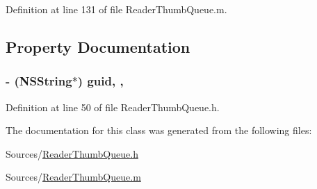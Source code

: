 Definition at line 131 of file Reader\-Thumb\-Queue.\-m.



\subsection{Property Documentation}
\hypertarget{interface_reader_thumb_operation_a00d9e3c5b3f57b2e6ff5de0deebfc3ec}{
\subsubsection[{guid}]{\setlength{\rightskip}{0pt plus 5cm}-\/ (N\-S\-String$\ast$) guid\hspace{0.3cm}{\ttfamily [read]}, {\ttfamily [nonatomic]}, {\ttfamily [strong]}}}\label{d1/d35/interface_reader_thumb_operation_a00d9e3c5b3f57b2e6ff5de0deebfc3ec}


Definition at line 50 of file Reader\-Thumb\-Queue.\-h.



The documentation for this class was generated from the following files\-:\begin{DoxyCompactItemize}
\item 
Sources/\hyperlink{_reader_thumb_queue_8h}{Reader\-Thumb\-Queue.\-h}\item 
Sources/\hyperlink{_reader_thumb_queue_8m}{Reader\-Thumb\-Queue.\-m}\end{DoxyCompactItemize}
